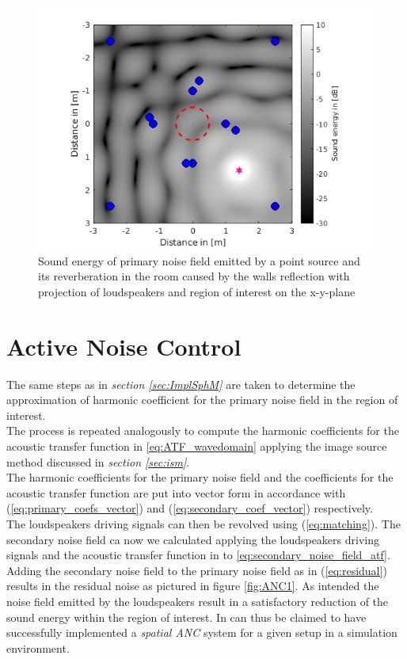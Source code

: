 \begin{figure}[H]
    \centerline{\includegraphics[width=\textwidth]{LaTeX/images/plots/Point_source_reverberation.png}}
    \caption{Sound energy of primary noise field emitted by a point source and its reverberation in the room caused by the walls reflection with projection of loudspeakers and region of interest on the x-y-plane}
    \label{fig:reverberation}
\end{figure}

\section{Active Noise Control}
The same steps as in \textit{section \ref{sec:ImplSphM}} are taken to determine the approximation of harmonic coefficient for the primary noise field in the region of interest.\\
The process is repeated analogously to compute the harmonic coefficients for the acoustic transfer function in \ref{eq:ATF_wavedomain} applying the image source method discussed in \textit{section \ref{sec:ism}}.\\
The harmonic coefficients for the primary noise field and the coefficients for the acoustic transfer function are put into vector form in accordance with (\ref{eq:primary_coefs_vector}) and (\ref{eq:secondary_coef_vector}) respectively.\\
The loudspeakers driving signals can then be revolved using (\ref{eq:matching}).
The secondary noise field ca now we calculated applying the loudspeakers driving signals and the acoustic transfer function in to \ref{eq:secondary_noise_field_atf}. Adding the secondary noise field to the primary noise field as in (\ref{eq:residual}) results in the residual noise as pictured in figure \ref{fig:ANC1}. As intended the noise field emitted by the loudspeakers result in a satisfactory reduction of the sound energy within the region of interest. In can thus be claimed to have successfully implemented a \textit{spatial ANC} system for a given setup in a simulation environment.\\\\

